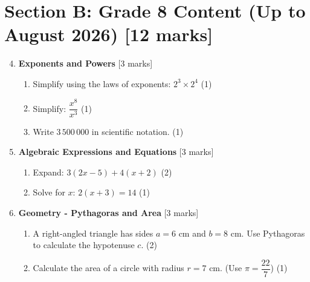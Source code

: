 \documentclass[12pt,a4paper]{article}
\begin{document}
\newpage
\section*{Section B: Grade 8 Content (Up to August 2026) [12 marks]}

\begin{enumerate}
    \setcounter{enumi}{3}
    
    \item \textbf{Exponents and Powers} \hfill [3 marks]
    
    \begin{enumerate}[label=(\alph*)]
        \item Simplify using the laws of exponents: $2^3 \times 2^4$ \hfill (1)
        \vspace{1.5cm}
        
        \item Simplify: $\dfrac{x^8}{x^3}$ \hfill (1)
        \vspace{1.5cm}
        
        \item Write $3\,500\,000$ in scientific notation. \hfill (1)
    \end{enumerate}
    
    \item \textbf{Algebraic Expressions and Equations} \hfill [3 marks]
    
    \begin{enumerate}[label=(\alph*)]
        \item Expand: $3(2x - 5) + 4(x + 2)$ \hfill (2)
        \vspace{3cm}
        
        \item Solve for $x$: $2(x + 3) = 14$ \hfill (1)
    \end{enumerate}
    
    \item \textbf{Geometry - Pythagoras and Area} \hfill [3 marks]
    
    \begin{enumerate}[label=(\alph*)]
        \item A right-angled triangle has sides $a = 6$ cm and $b = 8$ cm. Use Pythagoras to calculate the hypotenuse $c$. \hfill (2)
        \vspace{3cm}
        
        \item Calculate the area of a circle with radius $r = 7$ cm. (Use $\pi = \dfrac{22}{7}$) \hfill (1)
    \end{enumerate}
    

\end{enumerate}
\end{document}
